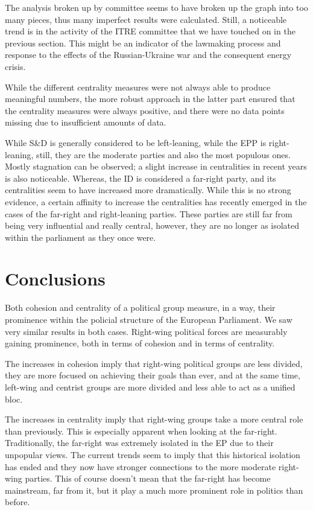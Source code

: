 \documentclass[lettersize,journal]{IEEEtran}
\begin{document}
The analysis broken up by committee seems to have broken up the graph into too many pieces, thus many imperfect results were calculated. Still, a noticeable trend is in the activity of the ITRE committee that we have touched on in the previous section. This might be an indicator of the lawmaking process and response to the effects of the Russian-Ukraine war and the consequent energy crisis. 

While the different centrality measures were not always able to produce meaningful numbers, the more robust approach in the latter part ensured that the centrality measures were always positive, and there were no data points missing due to insufficient amounts of data. %

While S\&D is generally considered to be left-leaning, while the EPP is right-leaning, still, they are the moderate parties and also the most populous ones. Mostly stagnation can be observed; a slight increase in centralities in recent years is also noticeable. Whereas, the ID is considered a far-right party, and its centralities seem to have increased more dramatically. While this is no strong evidence, a certain affinity to increase the centralities has recently emerged in the cases of the far-right and right-leaning parties. These parties are still far from being very influential and really central, however, they are no longer as isolated within the parliament as they once were.

\section{Conclusions} \label{sec:conclusions}

Both cohesion and centrality of a political group measure, in a way, their prominence within the policial structure of the European Parliament. We saw very similar results in both cases. Right-wing political forces are measurably gaining prominence, both in terms of cohesion and in terms of centrality.

The increases in cohesion imply that right-wing political groups are less divided, they are more focused on achieving their goals than ever, and at the same time, left-wing and centrist groups are more divided and less able to act as a unified bloc.

The increases in centrality imply that right-wing groups take a more central role than previously. This is especially apparent when looking at the far-right. Traditionally, the far-right was extremely isolated in the EP due to their unpopular views. The current trends seem to imply that this historical isolation has ended and they now have stronger connections to the more moderate right-wing parties. This of course doesn't mean that the far-right has become mainstream, far from it, but it play a much more prominent role in politics than before.
\end{document}
